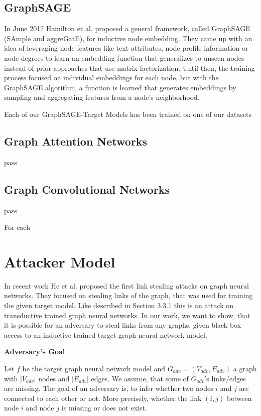     \subsection{GraphSAGE}
      In June 2017 Hamilton et al.\cite{hamilton2018inductive} proposed a general framework, called GraphSAGE (SAmple and aggreGatE), for inductive node embedding. 
      They came up with an idea of leveraging node features like text attributes, node profile information or node degrees to learn an embedding function that generalizes to unseen nodes instead of prior approaches that use matrix factorization.
      Until then, the training process focused on individual embeddings for each node, but with the GraphSAGE algorithm, a function is learned that generates embeddings by sampling and aggregating features from a node's neighborhood.
      
      Each of our GraphSAGE-Target Models has been trained on one of our datasets 


    \subsection{Graph Attention Networks}
      pass

    \subsection{Graph Convolutional Networks}
      pass

    For each   


  \section{Attacker Model}


  \newpage

  In recent work He et al. \cite{DBLP:journals/corr/abs-2005-02131} proposed the first link stealing attacks on graph neural networks.
  They focused on stealing links of the graph, that was used for training the given target model.
  Like described in Section 3.3.1 this is an attack on transductive trained graph neural networks.
  In our work, we want to show, that it is possible for an adversary to steal links from any graphs, given black-box access to an inductive trained target graph neural network model.

  \textbf{Adversary's Goal}

  Let $f$ be the target graph neural network model and $G_{adv} = (V_{adv}, E_{adv})$ a graph with $|V_{adv}|$ nodes and $|E_{adv}|$ edges. 
  We assume, that some of $G_{adv}$'s links/edges are missing.
  The goal of an adversary is, to infer whether two nodes $i$ and $j$ are connected to each other or not.
  More precisely, whether the link $(i,j)$ between node $i$ and node $j$ is missing or does not exist.
  


